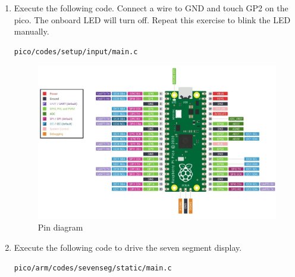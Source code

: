 \begin{enumerate}[label=\arabic*.,ref=\theenumi]
\item  Execute the following code.  Connect a wire to GND and touch GP2 on the pico.  The onboard LED will turn off.
Repeat this exercise to blink the LED manually.
\begin{lstlisting}
pico/codes/setup/input/main.c
\end{lstlisting}


\begin{figure}[!ht]
\centering
\includegraphics[width = \columnwidth]{pico/arm/setup/figs/pin_sheet.jpg}
\caption{Pin diagram}
\label{fig:pin_sheet}
\end{figure}
\item Execute the following code to drive the seven segment display.
\begin{lstlisting}
pico/arm/codes/sevenseg/static/main.c
\end{lstlisting}
\end{enumerate}



